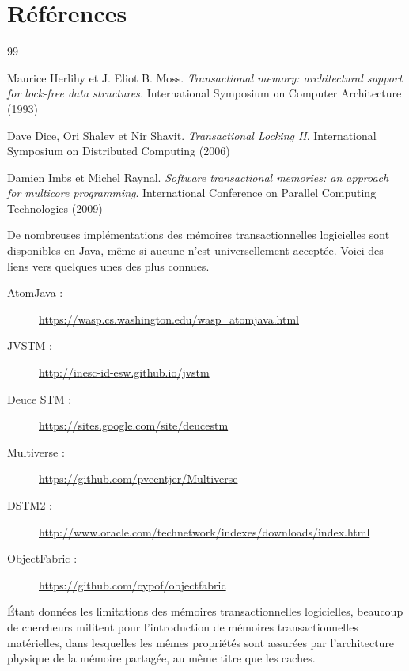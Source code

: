 \section{Références}

\renewcommand{\section}[2]{}%

\begin{thebibliography}{99}
  
  Maurice Herlihy et J. Eliot B. Moss. \emph{Transactional memory: architectural support for lock-free data structures.}
  International Symposium on Computer Architecture (1993)

  Dave Dice, Ori Shalev et Nir Shavit. \emph{Transactional Locking II}.
  International Symposium on Distributed Computing (2006)
  
  Damien Imbs et Michel Raynal. \emph{Software transactional memories: an approach for multicore programming}.
  International Conference on Parallel Computing Technologies (2009)

\end{thebibliography}

De nombreuses implémentations des mémoires transactionnelles logicielles sont disponibles en Java, même si aucune n'est universellement acceptée.
Voici des liens vers quelques unes des plus connues.

\begin{description}
\item [AtomJava :] \url{https://wasp.cs.washington.edu/wasp_atomjava.html}
\item [JVSTM :] \url{http://inesc-id-esw.github.io/jvstm}
\item [Deuce STM :] \url{https://sites.google.com/site/deucestm}
\item [Multiverse :] \url{https://github.com/pveentjer/Multiverse}
\item [DSTM2 :] \url{http://www.oracle.com/technetwork/indexes/downloads/index.html}
\item [ObjectFabric :] \url{https://github.com/cypof/objectfabric}
\end{description}

Étant données les limitations des mémoires transactionnelles logicielles, beaucoup de chercheurs militent pour l'introduction
de mémoires transactionnelles matérielles, dans lesquelles les mêmes propriétés sont assurées par l'architecture physique de
la mémoire partagée, au même titre que les caches.

\endgroup
\endinput
